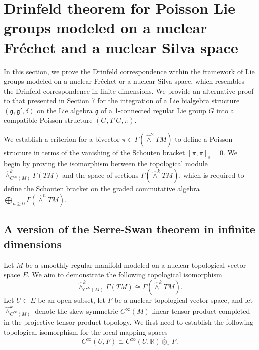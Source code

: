\documentclass[11pt,reqno]{amsart}
\theoremstyle{definition}
\numberwithin{equation}{section}
\begin{document}
\section{Drinfeld theorem for Poisson Lie groups modeled on a nuclear Fréchet and a nuclear Silva space}\label{8}

In this section, we prove the Drinfeld correspondence within the framework of Lie groups modeled on a nuclear Fréchet or a nuclear Silva space, which resembles the Drinfeld correspondence in finite dimensions. We provide an alternative proof to that presented in Section 7 for the integration of a Lie bialgebra structure $(\mathfrak{g}, \mathfrak{g}', \delta)$ on the Lie algebra $\mathfrak{g}$ of a 1-connected regular Lie group $G$ into a compatible Poisson structure $(G, T'G, \pi)$.

We establish a criterion for a bivector $\pi \in \Gamma(\hat\wedge^2TM)$ to define a Poisson structure in terms of the vanishing of the Schouten bracket $[\pi, \pi]_s=0$. We begin by proving the isomorphism between the topological module ${\hat\wedge}^k_{C^{\infty}(M)}\Gamma(TM)$ and the space of sections $\Gamma\left({\hat\wedge}^k TM\right)$, which is required to define the Schouten bracket on the graded commutative algebra $\bigoplus_{n\ge 0}\Gamma(\hat\wedge^n TM)$.

\subsection{A version of the Serre-Swan theorem in infinite dimensions}\label{S-S}
Let $M$ be a smoothly regular manifold modeled on a nuclear topological vector space $E$. We aim to demonstrate the following topological isomorphism
\[
{\hat\wedge}^k_{C^{\infty}(M)}\Gamma(TM) \cong \Gamma\left({\hat\wedge}^k TM\right).
\]
Let $U \subset E$ be an open subset, let $F$ be a nuclear topological vector space, and let $\hat\wedge^k_{C^\infty(M)}$ denote the skew-symmetric $C^\infty(M)$-linear tensor product completed in the projective tensor product topology. We first need to establish the following topological isomorphism for the local mapping spaces
\[
C^{\infty}(U, F) \cong C^{\infty}(U, \mathbb{R}) \hat{\otimes}_{\pi} F.
\]
\end{document}
